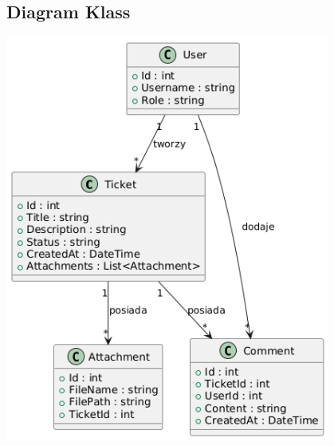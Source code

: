 \documentclass[a4paper,12pt]{article}
\begin{document}
\subsection{Diagram Klass}
\begin{center}
\includegraphics[width=0.8\textwidth]{draw/diagramClass.png}
\end{center}
\end{document}
